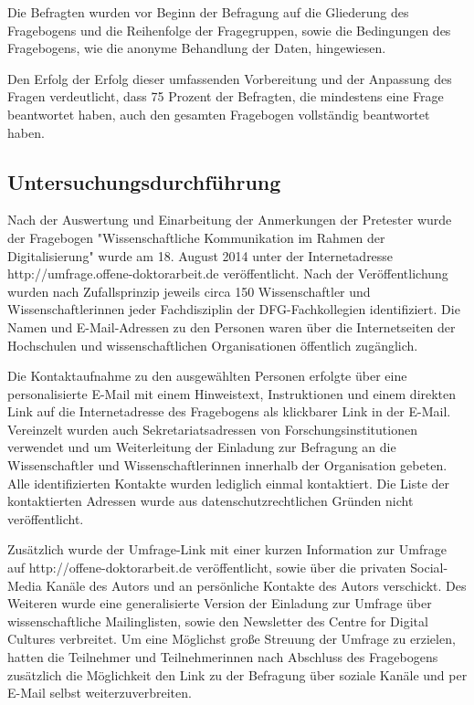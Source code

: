 Die Befragten wurden vor Beginn der Befragung auf die Gliederung des Fragebogens und die Reihenfolge der Fragegruppen, sowie die Bedingungen des Fragebogens, wie die anonyme Behandlung der Daten, hingewiesen.

Den Erfolg der Erfolg dieser umfassenden Vorbereitung und der Anpassung des Fragen verdeutlicht, dass 75 Prozent der Befragten, die mindestens eine Frage beantwortet haben, auch den gesamten Fragebogen vollständig beantwortet haben.

\subsection{Untersuchungsdurchführung}

Nach der Auswertung und Einarbeitung der Anmerkungen der Pretester wurde der Fragebogen "Wissenschaftliche Kommunikation im Rahmen der Digitalisierung" wurde am 18. August 2014 unter der Internetadresse http://umfrage.offene-doktorarbeit.de veröffentlicht. Nach der Veröffentlichung wurden nach Zufallsprinzip jeweils circa 150 Wissenschaftler und Wissenschaftlerinnen jeder Fachdisziplin der DFG-Fachkollegien \cite{DFG_2014} identifiziert. Die Namen und E-Mail-Adressen zu den Personen waren über die Internetseiten der Hochschulen und wissenschaftlichen Organisationen öffentlich zugänglich.

Die Kontaktaufnahme zu den ausgewählten Personen erfolgte über eine personalisierte E-Mail mit einem Hinweistext, Instruktionen und einem direkten Link auf die Internetadresse des Fragebogens als klickbarer Link in der E-Mail. Vereinzelt wurden auch Sekretariatsadressen von Forschungsinstitutionen verwendet und um Weiterleitung der Einladung zur Befragung an die Wissenschaftler und Wissenschaftlerinnen innerhalb der Organisation gebeten. Alle identifizierten Kontakte wurden lediglich einmal kontaktiert. Die Liste der kontaktierten Adressen wurde aus datenschutzrechtlichen Gründen nicht veröffentlicht.

Zusätzlich wurde der Umfrage-Link mit einer kurzen Information zur Umfrage auf http://offene-doktorarbeit.de veröffentlicht, sowie über die privaten Social-Media Kanäle des Autors und an persönliche Kontakte des Autors verschickt. Des Weiteren wurde eine generalisierte Version der Einladung zur Umfrage über wissenschaftliche Mailinglisten, sowie den Newsletter des Centre for Digital Cultures verbreitet. Um eine Möglichst große Streuung der Umfrage zu erzielen, hatten die Teilnehmer und Teilnehmerinnen nach Abschluss des Fragebogens zusätzlich die Möglichkeit den Link zu der Befragung über soziale Kanäle und per E-Mail selbst weiterzuverbreiten.

